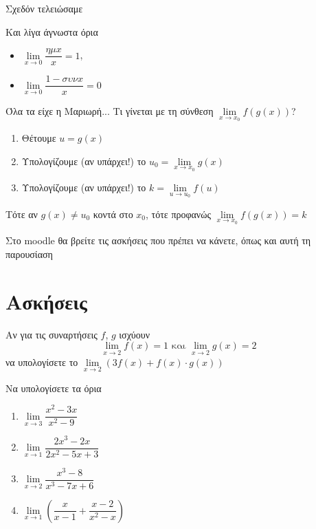 \documentclass{presentation}
\begin{document}
\begin{frame}{Σχεδόν τελειώσαμε}
  \begin{block}{Και λίγα άγνωστα όρια}
    \begin{itemize}
      \item $\lim\limits_{x \to 0}{ \dfrac{ημx}{x} }=1$, \pause
      \item $\lim\limits_{x \to 0}{ \dfrac{1-συνx}{x} }=0$
    \end{itemize}
  \end{block}
\end{frame}

\begin{frame}{Όλα τα είχε η Μαριωρή...}
  Τι γίνεται με τη σύνθεση  $\lim\limits_{x \to x_0}{ f(g(x))}$?
  \begin{enumerate}
    \item<1-> Θέτουμε $u=g(x)$
    \item<2-> Υπολογίζουμε (αν υπάρχει!) το $u_0=\lim\limits_{x \to x_0}{ g(x)}$
    \item<3-> Υπολογίζουμε (αν υπάρχει!) το $k=\lim\limits_{u \to u_0}{ f(u)}$
  \end{enumerate}
  Τότε αν $g(x)\ne u_0$ κοντά στο $x_0$, τότε προφανώς $\lim\limits_{x \to x_0}{ f(g(x))}=k$
\end{frame}

\begin{frame}
  Στο moodle θα βρείτε τις ασκήσεις που πρέπει να κάνετε, όπως και αυτή τη παρουσίαση
\end{frame}

\section{Ασκήσεις}

\begin{askisi}
  Αν για τις συναρτήσεις $f$, $g$ ισχύουν
  $$\lim\limits_{x \to 2}{ f(x) }=1 \text{ και } \lim\limits_{ x \to 2}{ g(x) }=2$$
  να υπολογίσετε το $\lim\limits_{x \to 2}{ (3f(x)+f(x)\cdot g(x)) }$

\end{askisi}

\begin{askisi}
  Να υπολογίσετε τα όρια
  \begin{enumerate}
    \item $\lim\limits_{x \to 3}{ \dfrac{x^2-3x}{x^2-9} }$ \pause
    \item $\lim\limits_{x \to 1}{ \dfrac{2x^3-2x}{2x^2-5x+3} }$ \pause
    \item $\lim\limits_{x \to 2}{ \dfrac{x^3-8}{x^3-7x+6} }$ \pause
    \item $\lim\limits_{x \to 1}{ \left( \dfrac{x}{x-1}+\dfrac{x-2}{x^2-x}  \right)  }$
  \end{enumerate}
\end{askisi}
\end{document}
